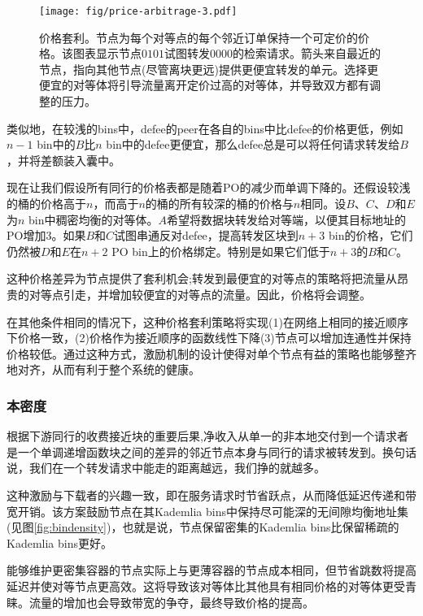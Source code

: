\begin{figure}[htbp]
   \centering
   \texttt{[image: fig/price-arbitrage-3.pdf]}
    \caption[价格套利\statusgreen]{价格套利。节点为每个对等点的每个邻近订单保持一个可定价的价格。该图表显示节点$0101$试图转发$0000$的检索请求。箭头来自最近的节点，指向其他节点(尽管离块更远)提供更便宜转发的单元。选择更便宜的对等体将引导流量离开定价过高的对等体，并导致双方都有调整的压力。}
   \label{fig:price-arbitrage}
\end{figure}
 


类似地，在较浅的bins中，defee的peer在各自的bins中比defee的价格更低，例如$n-1$ bin中的$B$比$n$ bin中的defee更便宜，那么defee总是可以将任何请求转发给$B$，并将差额装入囊中。

现在让我们假设所有同行的价格表都是随着PO的减少而单调下降的。还假设较浅的桶的价格高于$n$，而高于$n$的桶的所有较深的桶的价格与$n$相同。设$B$、$C$、$D$和$E$为$n$ bin中稠密均衡的对等体。$A$希望将数据块转发给对等端，以便其目标地址的PO增加3。如果$B$和$C$试图串通反对defee，提高转发区块到$n+3$ bin的价格，它们仍然被$D$和$E$在$n+2$ PO bin上的价格绑定。特别是如果它们低于$n+3$的$B$和$C$。

这种价格差异为节点提供了套利机会;转发到最便宜的对等点的策略将把流量从昂贵的对等点引走，并增加较便宜的对等点的流量。因此，价格将会调整。

在其他条件相同的情况下，这种价格套利策略将实现(1)在网络上相同的接近顺序下价格一致，(2)价格作为接近顺序的函数线性下降(3)节点可以增加连通性并保持价格较低。通过这种方式，激励机制的设计使得对单个节点有益的策略也能够整齐地对齐，从而有利于整个系统的健康。


\subsubsection{本密度}

根据下游同行的收费接近块的重要后果,净收入从单一的非本地交付到一个请求者是一个单调递增函数块之间的差异的邻近节点本身与同行的请求被转发到。换句话说，我们在一个转发请求中能走的距离越远，我们挣的就越多。

这种激励与下载者的兴趣一致，即在服务请求时节省跃点，从而降低延迟传递和带宽开销。该方案鼓励节点在其Kademlia bins中保持尽可能深的无间隙均衡地址集(见图\ref{fig:bindensity})，也就是说，节点保留密集的Kademlia bins比保留稀疏的Kademlia bins更好。


能够维护更密集容器的节点实际上与更薄容器的节点成本相同，但节省跳数将提高延迟并使对等节点更高效。这将导致该对等体比其他具有相同价格的对等体更受青睐。流量的增加也会导致带宽的争夺，最终导致价格的提高。

